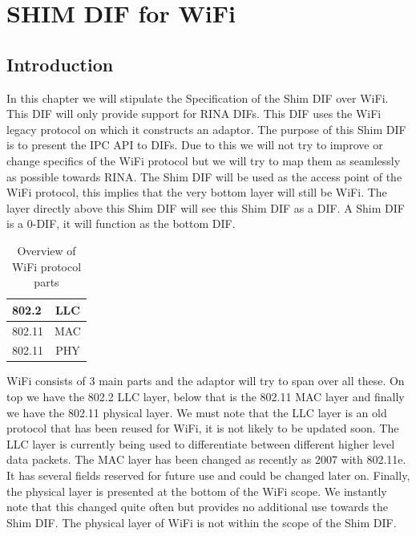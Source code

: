 

\chapter{SHIM DIF for WiFi}

\section{Introduction}

In this chapter we will stipulate the Specification of the Shim DIF over WiFi. This DIF will only provide support for RINA DIFs. This DIF uses the WiFi legacy protocol on which it constructs an adaptor. The purpose of this Shim DIF is to present the IPC API to DIFs. Due to this we will not try to improve or change specifics of the WiFi protocol but we will try to map them as seamlessly as possible towards RINA. The Shim DIF will be used as the access point of the WiFi protocol, this implies that the very bottom layer will still be WiFi. The layer directly above this Shim DIF will see this Shim DIF as a DIF. A Shim DIF is a 0-DIF, it will function as the bottom DIF.

\npar

\begin{table}[H]
		\begin{center}
		\begin{tabular}{|lc|}
			\hline
				802.2 & LLC		\\ \hline
				802.11 & MAC		\\ \hline
				802.11 & PHY		\\
			\hline
		\end{tabular}
		\caption{Overview of WiFi protocol parts}
		\end{center}
\end{table}

WiFi consists of 3 main parts and the adaptor will try to span over all these. On top we have the 802.2 LLC layer, below that is the 802.11 MAC layer and finally we have the 802.11 physical layer. We must note that the LLC layer is an old protocol that has been reused for WiFi, it is not likely to be updated soon. The LLC layer is currently being used to differentiate between different higher level data packets. The MAC layer has been changed as recently as 2007 with 802.11e. It has several fields reserved for future use and could be changed later on. Finally, the physical layer is presented at the bottom of the WiFi scope. We instantly note that this changed quite often but provides no additional use towards the Shim DIF. The physical layer of WiFi is not within the scope of the Shim DIF. 

